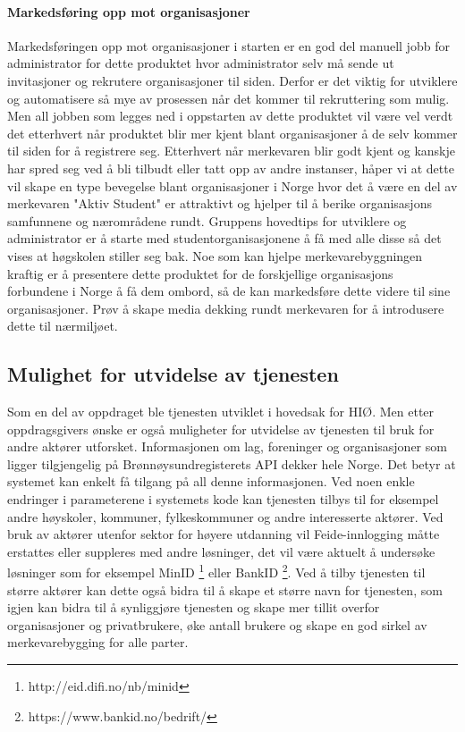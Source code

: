 \paragraph{Markedsføring opp mot organisasjoner}

Markedsføringen opp mot organisasjoner i starten er en god del manuell jobb for administrator for dette produktet hvor administrator selv må sende ut invitasjoner og rekrutere organisasjoner til siden. Derfor er det viktig for utviklere og automatisere så mye av prosessen når det kommer til rekruttering som mulig. Men all jobben som legges ned i oppstarten av dette produktet vil være vel verdt det etterhvert når produktet blir mer kjent blant organisasjoner å de selv kommer til siden for å registrere seg. Etterhvert når merkevaren blir godt kjent og kanskje har spred seg ved å bli tilbudt eller tatt opp av andre instanser, håper vi at dette vil skape en type bevegelse blant organisasjoner i Norge hvor det å være en del av merkevaren "Aktiv Student" er attraktivt og hjelper til å berike organisasjons samfunnene og nærområdene rundt. Gruppens hovedtips for utviklere og administrator er å starte med studentorganisasjonene å få med alle disse så det vises at høgskolen stiller seg bak. Noe som kan hjelpe merkevarebyggningen kraftig er å presentere dette produktet for de forskjellige organisasjons forbundene i Norge å få dem ombord, så de kan markedsføre dette videre til sine organisasjoner. Prøv å skape media dekking rundt merkevaren for å introdusere dette til nærmiljøet. 

\subsection{Mulighet for utvidelse av tjenesten}
Som en del av oppdraget ble tjenesten utviklet i hovedsak for HIØ. Men etter oppdragsgivers ønske er også muligheter for utvidelse av tjenesten til bruk for andre aktører utforsket. Informasjonen om lag, foreninger og organisasjoner som ligger tilgjengelig på Brønnøysundregisterets API dekker hele Norge. Det betyr at systemet kan enkelt få tilgang på all denne informasjonen. Ved noen enkle endringer i parameterene i systemets kode kan tjenesten tilbys til for eksempel andre høyskoler, kommuner, fylkeskommuner og andre interesserte aktører. Ved bruk av aktører utenfor sektor for høyere utdanning vil Feide-innlogging måtte erstattes eller suppleres med andre løsninger, det vil være aktuelt å undersøke løsninger som for eksempel MinID \footnote{http://eid.difi.no/nb/minid} eller BankID \footnote{https://www.bankid.no/bedrift/}. Ved å tilby tjenesten til større aktører kan dette også bidra til å skape et større navn for tjenesten, som igjen kan bidra til å synliggjøre tjenesten og skape mer tillit overfor organisasjoner og privatbrukere, øke antall brukere og skape en god sirkel av merkevarebygging for alle parter.

